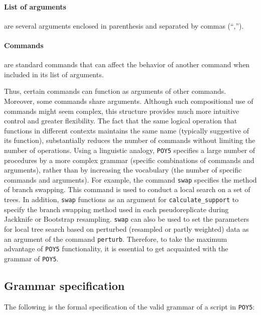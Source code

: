 \documentclass[11pt]{book}
\newcommand{\commandstyle}[1]{\texttt{#1}}
\newcommand{\poycommand}[1]{\commandstyle{#1}}
\newcommand{\poy}{\commandstyle{POY5}\xspace}
\begin{document}
\paragraph{List of arguments} are several arguments enclosed in parenthesis and
separated by commas (``,''). 

\paragraph{Commands} are standard commands that can affect the behavior of
another command when included in its list of arguments.

Thus, certain commands can function as arguments of other commands. Moreover,
some commands share arguments. Although such compositional use of commands
might seem complex, this structure provides much more intuitive
control and greater flexibility. The fact that the same logical operation that functions
in different contexts maintains
the same name (typically suggestive of its function), substantially reduces the number of
commands without limiting the number of operations. Using a linguistic analogy,
\poy specifies a large number of procedures by a more complex grammar (specific
combinations of commands and arguments), rather than by increasing the vocabulary
(the number of specific commands and arguments). For example, the command
\poycommand{swap} specifies the method of branch swapping. This command is
used to conduct a local search on a set of trees. In addition,
\poycommand{swap} functions as an argument for \poycommand{calculate\_support}
to specify the branch swapping method used in each pseudoreplicate during Jackknife or
Bootstrap resampling. \poycommand{swap} can also be used to set the parameters for
local tree search based on perturbed (resampled or partly weighted) data as an argument
of the command \poycommand{perturb}. Therefore, to take the maximum advantage of
\poy functionality, it is essential to get acquainted with the grammar of  \poy.

\subsection{Grammar specification}

The following is the formal specification of the valid grammar of a script in \poy:
\end{document}
